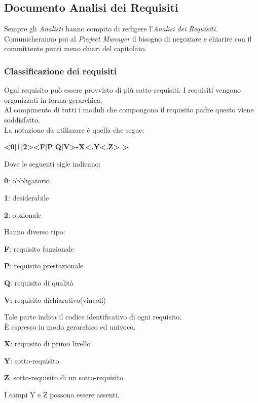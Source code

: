 \documentclass[12pt,a4paper,titlepage]{article}
\begin{document}
\subsection{Documento Analisi dei Requisiti}
Sempre gli \textit{Analisti} hanno compito di redigere l'\textit{Analisi dei Requisiti}. Comunicheranno poi al \textit{Project Manager} il bisogno di negoziare e chiarire con il committente punti meno chiari del capitolato.

\subsubsection{Classificazione dei requisiti}
Ogni requisito può essere provvisto di più sotto-requisiti. I requisiti vengono organizzati in forma gerarchica.\\
Al compimento di tutti i moduli che compongono il requisito padre questo viene soddisfatto.\\
La notazione da utilizzare è quella che segue:
\begin{center}
\textbf{ <0|1|2><F|P|Q|V>-X<.Y<.Z> > }
\end{center}

Dove le seguenti sigle indicano:
\begin{trivlist}
	\item \textbf{0}: obbligatorio
	\item \textbf{1}: desiderabile
	\item \textbf{2}: opzionale
\end{trivlist} 

Hanno diverso tipo:
\begin{trivlist}
	\item \textbf{F}: requisito funzionale
	\item \textbf{P}: requisito prestazionale
	\item \textbf{Q}: requisito di qualità
	\item \textbf{V}: requisito dichiarativo(vincoli)
\end{trivlist} 

Tale parte indica il codice identificativo di ogni requisito.\\
È espresso in modo gerarchico ed univoco.
\begin{trivlist}
	\item \textbf{X}: requisito di primo livello
	\item \textbf{Y}: sotto-requisito
	\item \textbf{Z}: sotto-requisito di un sotto-requisito
\end{trivlist} 
I campi Y e Z possono essere assenti.\\
\end{document}
